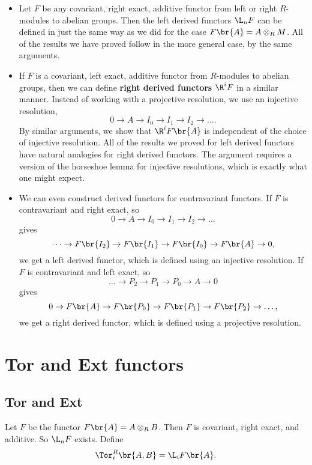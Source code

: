 \begin{proposition}
\hfill
\begin{itemize}
\item Let $ F $ be any covariant, right exact, additive functor from left or right $ R $-modules to abelian groups. Then the left derived functors $ \L_nF $ can be defined in just the same way as we did for the case $ F\br{A} = A \otimes_R M $. All of the results we have proved follow in the more general case, by the same arguments.
\item If $ F $ is a covariant, left exact, additive functor from $ R $-modules to abelian groups, then we can define \textbf{right derived functors} $ \R^iF $ in a similar manner. Instead of working with a projective resolution, we use an injective resolution,
$$ 0 \to A \to I_0 \to I_1 \to I_2 \to \dots. $$
By similar arguments, we show that $ \R^iF\br{A} $ is independent of the choice of injective resolution. All of the results we proved for left derived functors have natural analogies for right derived functors. The argument requires a version of the horseshoe lemma for injective resolutions, which is exactly what one might expect.
\item We can even construct derived functors for contravariant functors. If $ F $ is contravariant and right exact, so
$$ 0 \to A \to I_0 \to I_1 \to I_2 \to \dots $$
gives
$$ \dots \to F\br{I_2} \to F\br{I_1} \to F\br{I_0} \to F\br{A} \to 0, $$
we get a left derived functor, which is defined using an injective resolution. If $ F $ is contravariant and left exact, so
$$ \dots \to P_2 \to P_1 \to P_0 \to A \to 0 $$
gives
$$ 0 \to F\br{A} \to F\br{P_0} \to F\br{P_1} \to F\br{P_2} \to \dots, $$
we get a right derived functor, which is defined using a projective resolution.
\end{itemize}
\end{proposition}

\pagebreak

\section{Tor and Ext functors}

\subsection{Tor and Ext}

\begin{definition}
Let $ F $ be the functor $ F\br{A} = A \otimes_R B $. Then $ F $ is covariant, right exact, and additive. So $ \L_nF $ exists. Define
$$ \Tor_i^R\br{A, B} = \L_iF\br{A}. $$
\end{definition}

